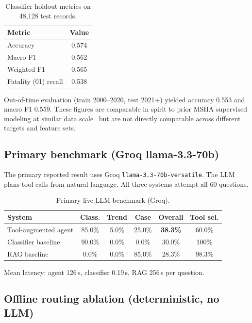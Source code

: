 \documentclass[11pt,a4paper]{article}
\begin{document}
\begin{table}[htbp]
  \centering
  \caption{Classifier holdout metrics on 48{,}128 test records.}
  \label{tab:classifier}
  \begin{tabular}{@{}lc@{}}
    \toprule
    Metric & Value \\
    \midrule
    Accuracy & 0.574 \\
    Macro F1 & 0.562 \\
    Weighted F1 & 0.565 \\
    Fatality (01) recall & 0.538 \\
    \bottomrule
  \end{tabular}
\end{table}

Out-of-time evaluation (train 2000--2020, test 2021+) yielded accuracy 0.553
and macro F1 0.559. These figures are comparable in spirit to prior MSHA
supervised modeling at similar data scale~\cite{Yedla2020} but are not directly
comparable across different targets and feature sets.

\subsection{Primary benchmark (Groq llama-3.3-70b)}

The primary reported result uses Groq \texttt{llama-3.3-70b-versatile}. The LLM
plans tool calls from natural language. All three systems attempt all 60
questions.

\begin{table}[htbp]
  \centering
  \caption{Primary live LLM benchmark (Groq).}
  \label{tab:groq}
  \begin{tabular}{@{}lccccc@{}}
    \toprule
    System & Class. & Trend & Case & Overall & Tool sel. \\
    \midrule
    Tool-augmented agent & 85.0\% & 5.0\% & 25.0\% & \textbf{38.3\%} & 60.0\% \\
    Classifier baseline & 90.0\% & 0.0\% & 0.0\% & 30.0\% & 100\% \\
    RAG baseline & 0.0\% & 0.0\% & 85.0\% & 28.3\% & 98.3\% \\
    \bottomrule
  \end{tabular}
\end{table}

Mean latency: agent 126\,s, classifier 0.19\,s, RAG 256\,s per question.

\subsection{Offline routing ablation (deterministic, no LLM)}
\end{document}
